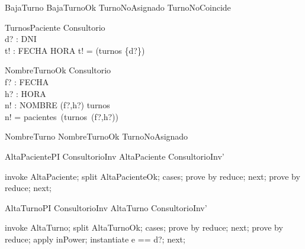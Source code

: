 \begin{zed}
BajaTurno  BajaTurnoOk \lor TurnoNoAsignado \lor TurnoNoCoincide
\end{zed}

\begin{schema}{TurnosPaciente}
\Xi Consultorio \\
d? : DNI \\
t! : FECHA \rel HORA
\where
t! = \dom (turnos \rres \{d?\})
\end{schema}

\begin{schema}{NombreTurnoOk}
\Xi Consultorio \\
f? : FECHA \\
h? : HORA \\
n! : NOMBRE
\where
(f?,h?) \in \dom turnos \\
n! = pacientes\ (turnos\ (f?,h?))
\end{schema}

\begin{zed}
NombreTurno  NombreTurnoOk \lor TurnoNoAsignado
\end{zed}

\begin{theorem}{AltaPacientePI}
ConsultorioInv \land AltaPaciente \implies ConsultorioInv'
\end{theorem}

\begin{zproof}[AltaPacientePI]
invoke AltaPaciente;
split AltaPacienteOk;
cases;
prove by reduce;
next;
prove by reduce;
next;
\end{zproof}

\begin{theorem}{AltaTurnoPI}
ConsultorioInv \land AltaTurno \implies ConsultorioInv'
\end{theorem}

\begin{zproof}[AltaTurnoPI]
invoke AltaTurno;
split AltaTurnoOk;
cases;
prove by reduce;
next;
prove by reduce;
apply inPower;
instantiate e == d?;
next;
\end{zproof}
